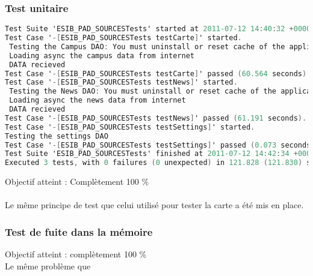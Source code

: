 		 		 \subsubsection*{Test unitaire}
		 		 \begin{lstlisting}[language=C,caption = Log des test unitaires]
Test Suite 'ESIB_PAD_SOURCESTests' started at 2011-07-12 14:40:32 +0000
Test Case '-[ESIB_PAD_SOURCESTests testCarte]' started.
 Testing the Campus DAO: You must uninstall or reset cache of the application before testing
 Loading async the campus data from internet
 DATA recieved
Test Case '-[ESIB_PAD_SOURCESTests testCarte]' passed (60.564 seconds).
Test Case '-[ESIB_PAD_SOURCESTests testNews]' started.
 Testing the News DAO: You must uninstall or reset cache of the application before testing
 Loading async the news data from internet
 DATA recieved
Test Case '-[ESIB_PAD_SOURCESTests testNews]' passed (61.191 seconds).
Test Case '-[ESIB_PAD_SOURCESTests testSettings]' started.
Testing the settings DAO
Test Case '-[ESIB_PAD_SOURCESTests testSettings]' passed (0.073 seconds).
Test Suite 'ESIB_PAD_SOURCESTests' finished at 2011-07-12 14:42:34 +0000.
Executed 3 tests, with 0 failures (0 unexpected) in 121.828 (121.830) seconds
		 		 \end{lstlisting}
		 		Objectif atteint : {\color{green}Complètement 100 \% \CheckedBox}\\
		 		\\
		 		Le même principe de test que celui utilisé pour tester la carte a été mis en place.
		 		 \subsubsection*{Test de fuite dans la mémoire}
		 		 Objectif atteint : {\color{green}complètement 100 \% \CheckedBox}\\
		 		Le même problème que 
